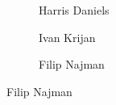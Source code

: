 \begin{frame}[plain]
\begin{figure}[h]
\begin{subfigure}{0.23\textwidth}
	\caption{\scriptsize Harris Daniels}
	\end{subfigure}
	\begin{subfigure}{0.23\textwidth}
	\captionsetup{labelformat=empty}
	\centering
	\caption{\scriptsize Ivan Krijan}
	\end{subfigure}
	\begin{subfigure}{0.23\textwidth}
	\captionsetup{labelformat=empty}
	\centering
	\caption{\scriptsize Filip Najman}
	\end{subfigure}
	\end{figure}
\end{frame}



